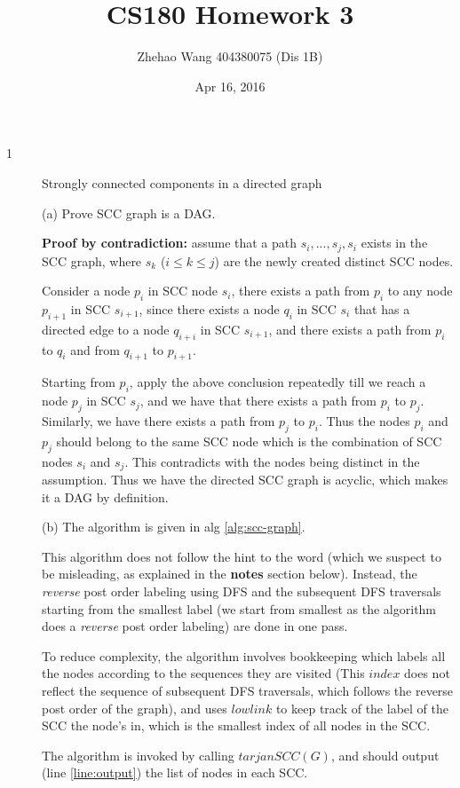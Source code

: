 \documentclass{article}
\title{CS180 Homework 3}
\author{Zhehao Wang 404380075 (Dis 1B)}
\date{Apr 16, 2016}
\begin{document}
\maketitle

\begin{description}

\item[1]{Strongly connected components in a directed graph}
  
  (a) Prove SCC graph is a DAG.

  \textbf{Proof by contradiction:} assume that a path $s_i, ..., s_j, s_i$ exists in the SCC graph, where $s_k$ ($i \leq k \leq j$) are the newly created distinct SCC nodes.

  Consider a node $p_i$ in SCC node $s_i$, there exists a path from $p_i$ to any node $p_{i+1}$ in SCC $s_{i+1}$, since there exists a node $q_i$ in SCC $s_i$ that has a directed edge to a node $q_{i+i}$ in SCC $s_{i+1}$, and there exists a path from $p_i$ to $q_i$ and from $q_{i+1}$ to $p_{i+1}$.

  Starting from $p_i$, apply the above conclusion repeatedly till we reach a node $p_j$ in SCC $s_j$, and we have that there exists a path from $p_i$ to $p_j$. Similarly, we have there exists a path from $p_j$ to $p_i$. Thus the nodes $p_i$ and $p_j$ should belong to the same SCC node which is the combination of SCC nodes $s_i$ and $s_j$. This contradicts with the nodes being distinct in the assumption. Thus we have the directed SCC graph is acyclic, which makes it a DAG by definition.

  (b) The algorithm is given in alg \ref{alg:scc-graph}. 

  This algorithm does not follow the hint to the word (which we suspect to be misleading, as explained in the \textbf{notes} section below). Instead, the \textit{reverse} post order labeling using DFS and the subsequent DFS traversals starting from the smallest label (we start from smallest as the algorithm does a \textit{reverse} post order labeling) are done in one pass. 

  To reduce complexity, the algorithm involves bookkeeping which labels all the nodes according to the sequences they are visited (This $index$ does not reflect the sequence of subsequent DFS traversals, which follows the reverse post order of the graph), and uses $lowlink$ to keep track of the label of the SCC the node's in, which is the smallest index of all nodes in the SCC.

  The algorithm is invoked by calling $tarjanSCC(G)$, and should output (line \ref{line:output}) the list of nodes in each SCC.


\end{description}
\end{document}
